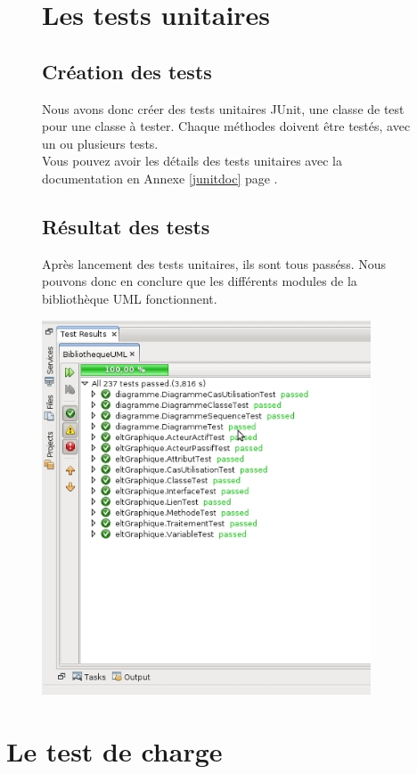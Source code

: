 \documentclass[12pt,a4paper,openany]{report}
\begin{document}
			\begin{figure}[H]
				\section{Les tests unitaires}
				\subsection{Création des tests}
				\begin{flushleft}
					Nous avons donc créer des tests unitaires JUnit, une classe de test pour une classe à tester. Chaque méthodes doivent être testés, 
					avec un ou plusieurs tests.\\
					Vous pouvez avoir les détails des tests unitaires avec la documentation en Annexe \ref{junitdoc} page \pageref{junitdoc}.
				\subsection{Résultat des tests}
				Après lancement des tests unitaires, ils sont tous passéss. Nous pouvons donc en conclure que les différents modules de la bibliothèque UML fonctionnent. 
				\end{flushleft}

				\centering
				\includegraphics[width=9.75cm]{junitPassed.jpg} 
			\end{figure}
			\newpage
	\section{Le test de charge}
\end{document}
